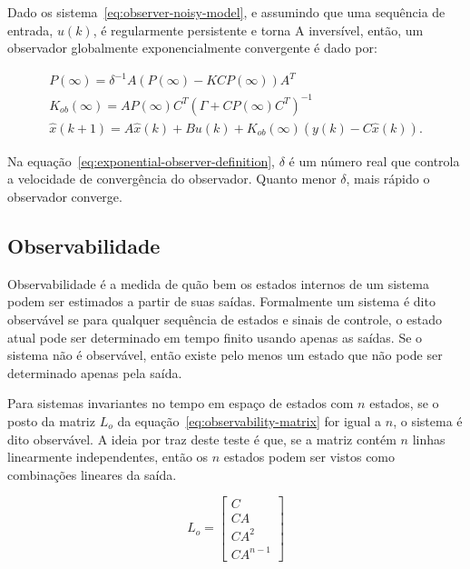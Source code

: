 \begin{theorem}%
	\label{theorem:exponential-observer}
	Dado os sistema~\eqref{eq:observer-noisy-model}, e assumindo que uma
	sequência de entrada, \( u(k) \),  é regularmente persistente e torna A
	inversível, então, um observador globalmente exponencialmente convergente é
	dado por:

	\begin{equation}
		\label{eq:exponential-observer-definition}
		\begin{split}
			P(\infty)=\delta^{-1}A(P(\infty)-KCP(\infty))A^T \\
			K_{ob}(\infty)=AP(\infty)C^T{(\Gamma+CP(\infty)C^T)}^{-1} \\
			\hat{x}(k+1) = A\hat{x}(k) + Bu(k) + K_{ob}(\infty)(y(k) - C\hat{x}(k)).
		\end{split}
	\end{equation}
\end{theorem}

Na equação~\eqref{eq:exponential-observer-definition}, \( \delta{} \) é um
número real que controla a velocidade de convergência do observador. Quanto
menor \( \delta{} \), mais rápido o observador converge.

\subsection{Observabilidade}%
\label{subsec:observability}

Observabilidade é a medida de quão bem os estados internos de um sistema podem
ser estimados a partir de suas saídas. Formalmente um sistema é dito observável
se para qualquer sequência de estados e sinais de controle, o estado atual pode
ser determinado em tempo finito usando apenas as saídas. Se o sistema não é
observável, então existe pelo menos um estado que não pode ser determinado
apenas pela saída.

Para sistemas invariantes no tempo em espaço de estados com \( n \) estados, se
o posto da matriz \( L_o \) da equação~\eqref{eq:observability-matrix} for igual
a \( n \), o sistema é dito observável. A ideia por traz deste teste é que, se a
matriz contém \( n \) linhas linearmente independentes, então os \( n \) estados
podem ser vistos como combinações lineares da saída.

\begin{equation}
	\label{eq:observability-matrix}
	L_o = \begin{bmatrix}
		C       \\
		CA      \\
		CA^2    \\
		CA^{n-1}
	\end{bmatrix}
\end{equation}
